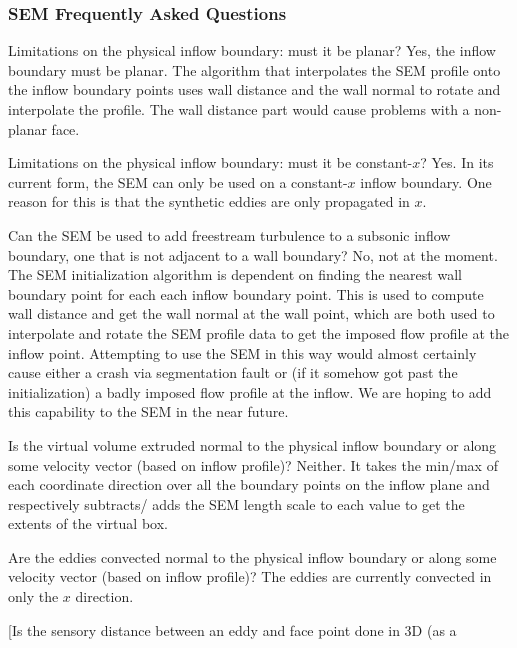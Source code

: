 \subsubsection{SEM Frequently Asked Questions}\label{SEC:SEM:FAQ}

\begin{QandA}
%
  \item[Limitations on the physical inflow boundary: must it be planar?]
    Yes, the inflow boundary must be planar. The algorithm that interpolates the
    SEM profile onto the inflow boundary points uses wall distance and the wall
    normal to rotate and interpolate the profile. The wall distance part would
    cause problems with a non-planar face.
%
  \item[Limitations on the physical inflow boundary: must it be constant-$x$?]
    Yes. In its current form, the SEM can only be used on a constant-$x$ inflow
    boundary. One reason for this is that the synthetic eddies are only
    propagated in $x$. 
%
  \item[Can the SEM be used to add freestream turbulence to a \quoterm{farfield}
    subsonic inflow boundary, \thatis one that is not adjacent to a wall
    boundary?]
    No, not at the moment. The SEM initialization algorithm is dependent on
    finding the nearest wall boundary point for each each inflow boundary point.
    This is used to compute wall distance and get the wall normal at the wall
    point, which are both used to interpolate and rotate the SEM profile data to
    get the imposed flow profile at the inflow point. Attempting to use the SEM
    in this way would almost certainly cause either a crash via segmentation
    fault or (if it somehow got past the initialization) a badly imposed
    flow profile at the inflow. We are hoping to add this capability to the SEM
    in the near future.
%
  \item[Is the virtual volume extruded normal to the physical inflow boundary or
    along some velocity vector (based on inflow profile)?]
    Neither. It takes the min\slash max of each coordinate direction over all
    the boundary points on the inflow plane and respectively subtracts\slash
    adds the SEM length scale to each value to get the extents of the virtual
    box.
%
  \item[Are the eddies convected normal to the physical inflow boundary or along
    some velocity vector (based on inflow profile)?]
    The eddies are currently convected in only the $x$ direction.
%
  \item[Is the sensory distance between an eddy and face point done in 3D (as a

\end{QandA}
